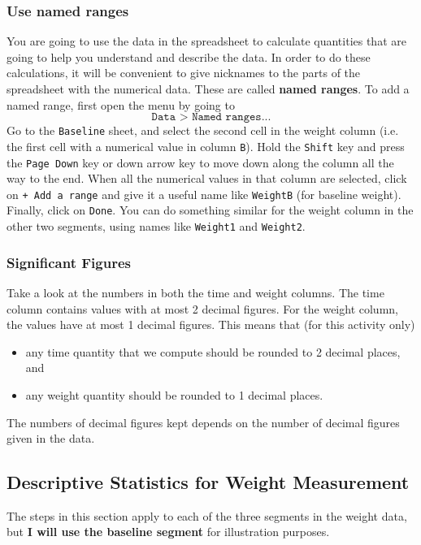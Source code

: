 \subsubsection{Use named ranges}
%
You are going to use the data in the spreadsheet to calculate quantities that are going to help you understand and describe the data. In order to do these calculations, it will be convenient to give nicknames to the parts of the spreadsheet with the numerical data. These are called \textbf{named ranges}. To add a named range, first open the menu by going to
\begin{equation}
    \texttt{Data > Named ranges...}
\end{equation}
Go to the \texttt{Baseline} sheet, and select the second cell in the weight column (i.e. the first cell with a numerical value in column \texttt{B}). Hold the \texttt{Shift} key and press the \texttt{Page Down} key or down arrow key to move down along the column all the way to the end. When all the numerical values in that column are selected, click on \texttt{+ Add a range} and give it a useful name like \texttt{WeightB} (for baseline weight). Finally, click on \texttt{Done}. You can do something similar for the weight column in the other two segments, using names like \texttt{Weight1} and \texttt{Weight2}.
%
\subsubsection{Significant Figures}
%
Take a look at the numbers in both the time and weight columns. The time column contains values with at most 2 decimal figures. For the weight column, the values have at most 1 decimal figures. This means that (for this activity only)
\begin{itemize}
    \item any time quantity that we compute should be rounded to 2 decimal places, and
    \item any weight quantity should be rounded to 1 decimal places.
\end{itemize}
The numbers of decimal figures kept depends on the number of decimal figures given in the data.
%
\subsection{Descriptive Statistics for Weight Measurement}
%
The steps in this section apply to each of the three segments in the weight data, but \textbf{I will use the baseline segment} for illustration purposes.
%
